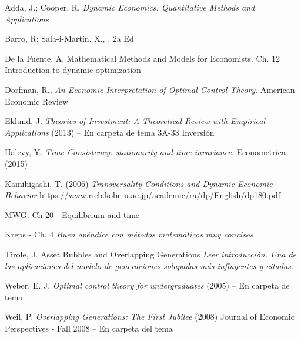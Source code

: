 \documentclass{nuevotema}
\begin{document}
Adda, J.; Cooper, R. \textit{Dynamic Economics. Quantitative Methods and Applications}

Barro, R; Sala-i-Martín, X., . 2a Ed

De la Fuente, A. Mathematical Methods and Models for Economists. Ch. 12 Introduction to dynamic optimization

Dorfman, R., \textit{An Economic Interpretation of Optimal Control Theory}. American Economic Review

Eklund, J. \textit{Theories of Investment: A Theoretical Review with Empirical Applications} (2013) -- En carpeta de tema 3A-33 Inversión

Halevy, Y. \textit{Time Consistency: stationarity and time invariance}. Econometrica (2015)

Kamihigashi, T. (2006) \textit{Transversality Conditions and Dynamic Economic Behavior} \url{https://www.rieb.kobe-u.ac.jp/academic/ra/dp/English/dp180.pdf} 

MWG. Ch 20 - Equilibrium and time

Kreps - Ch. 4 \textit{Buen apéndice con métodos matemáticos muy concisos}





Tirole, J. Asset Bubbles and Overlapping Generations
\textit{Leer introducción. Una de las aplicaciones del modelo de generaciones solapadas más influyentes y citadas.}

Weber, E. J. \textit{Optimal control theory for undergraduates} (2005) -- En carpeta de tema

Weil, P. \textit{Overlapping Generations: The First Jubilee} (2008) Journal of Economic Perspectives - Fall 2008 -- En carpeta del tema
\end{document}
